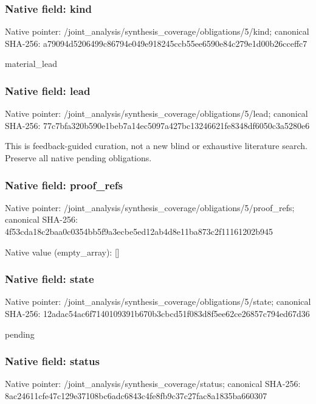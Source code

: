 \documentclass[10pt,a4paper]{article}
\begin{document}
\subsubsection{Native field: kind}
Native pointer: /joint\_\allowbreak{}analysis/synthesis\_\allowbreak{}coverage/obligations/5/kind; canonical SHA-256: a79094d5206499c86794e049e918245ccb55ee6590e84c279e1d00b26cceffc7

\begingroup\raggedright\sloppy material\_\allowbreak{}lead\par\endgroup

\subsubsection{Native field: lead}
Native pointer: /joint\_\allowbreak{}analysis/synthesis\_\allowbreak{}coverage/obligations/5/lead; canonical SHA-256: 77c7bfa320b590e1beb7a14ec5097a427bc13246621fe8348df6050c3a5280e6

\begingroup\raggedright\sloppy This is feedback-guided curation,\allowbreak{} not a new blind or exhaustive literature search. Preserve all native pending obligations.\par\endgroup

\subsubsection{Native field: proof\_\allowbreak{}refs}
Native pointer: /joint\_\allowbreak{}analysis/synthesis\_\allowbreak{}coverage/obligations/5/proof\_\allowbreak{}refs; canonical SHA-256: 4f53cda18c2baa0c0354bb5f9a3ecbe5ed12ab4d8e11ba873c2f11161202b945

Native value (empty\_\allowbreak{}array): []

\subsubsection{Native field: state}
Native pointer: /joint\_\allowbreak{}analysis/synthesis\_\allowbreak{}coverage/obligations/5/state; canonical SHA-256: 12adac54ac6f7140109391b670b3cbcd51f083d8f5ee62ce26857c794ed67d36

\begingroup\raggedright\sloppy pending\par\endgroup

\subsubsection{Native field: status}
Native pointer: /joint\_\allowbreak{}analysis/synthesis\_\allowbreak{}coverage/status; canonical SHA-256: 8ac24611cfe47c129e37108bc6adc6843c4fe8fb9c37c27fac8a1835ba660307
\end{document}

